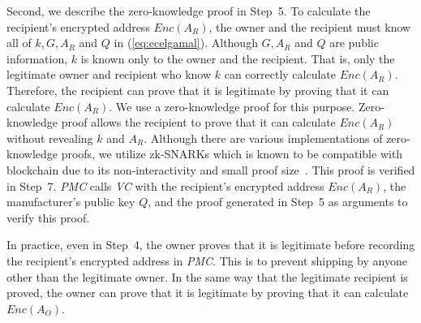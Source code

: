 \documentclass[conference]{IEEEtran}
\begin{document}
Second, we describe the zero-knowledge proof in Step~5.
To calculate the recipient's encrypted address $\textit{Enc}(A_R)$, the owner and the recipient must know all of $k, G, A_R$ and $Q$ in (\ref{eq:ecelgamal}).
Although $G, A_R$ and $Q$ are public information, $k$ is known only to the owner and the recipient.
That is, only the legitimate owner and recipient who know $k$ can correctly calculate $\textit{Enc}(A_R)$.
Therefore, the recipient can prove that it is legitimate by proving that it can calculate $\textit{Enc}(A_R)$.
We use a zero-knowledge proof for this purpose.
Zero-knowledge proof allows the recipient to prove that it can calculate $\textit{Enc}(A_R)$ without revealing $k$ and $A_R$.
Although there are various implementations of zero-knowledge proofs, we utilize zk-SNARKs which is known to be compatible with blockchain due to its non-interactivity and small proof size~\cite{zk-SNARKsInBC}. 
This proof is verified in Step~7.
\textit{PMC} calls \textit{VC} with the recipient's encrypted address $\textit{Enc}(A_R)$, the manufacturer's public key $Q$, and the proof generated in Step~5 as arguments to verify this proof.

In practice, even in Step~4, the owner proves that it is legitimate before recording the recipient's encrypted address in \textit{PMC}.
This is to prevent shipping by anyone other than the legitimate owner.
In the same way that the legitimate recipient is proved, the owner can prove that it is legitimate by proving that it can calculate $\textit{Enc}(A_O)$.
\end{document}
